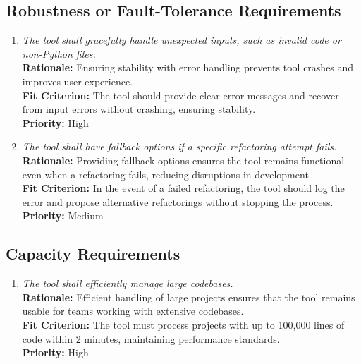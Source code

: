 \documentclass[12pt]{article}
\begin{document}
\subsection{Robustness or Fault-Tolerance Requirements}
\begin{enumerate}[label=PR-RFT \arabic*., wide=0pt, leftmargin=*]
    \item \emph{The tool shall gracefully handle unexpected inputs, such as invalid code or non-Python files.}\\[2mm]
    {\bf Rationale:} Ensuring stability with error handling prevents tool crashes and improves user experience.\\
    {\bf Fit Criterion:} The tool should provide clear error messages and recover from input errors without crashing, ensuring stability.\\
    {\bf Priority:} High
    \item \emph{The tool shall have fallback options if a specific refactoring attempt fails.}\\[2mm]
    {\bf Rationale:} Providing fallback options ensures the tool remains functional even when a refactoring fails, reducing disruptions in development.\\
    {\bf Fit Criterion:} In the event of a failed refactoring, the tool should log the error and propose alternative refactorings without stopping the process.\\
    {\bf Priority:} Medium
\end{enumerate}

\subsection{Capacity Requirements}
\begin{enumerate}[label=PR-CR \arabic*., wide=0pt, leftmargin=*]
    \item \emph{The tool shall efficiently manage large codebases.}\\[2mm]
    {\bf Rationale:} Efficient handling of large projects ensures that the tool remains usable for teams working with extensive codebases.\\
    {\bf Fit Criterion:} The tool must process projects with up to 100,000 lines of code within 2 minutes, maintaining performance standards.\\
    {\bf Priority:} High
\end{enumerate}
\end{document}
